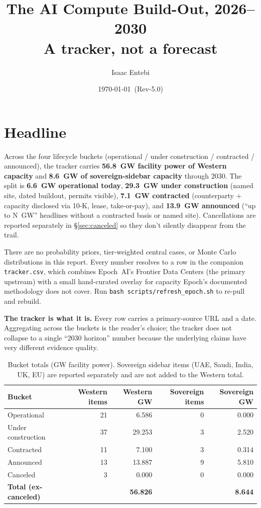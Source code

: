 \documentclass[11pt]{article}
\title{\textbf{The AI Compute Build-Out, 2026--2030} \\ \large A tracker, not a forecast}
\author{Isaac Entebi}
\date{\today\ (Rev-5.0)}
\begin{document}
\maketitle

\section*{Headline}

Across the four lifecycle buckets (operational / under construction / contracted / announced), the tracker carries 
\textbf{56.8~GW facility power of Western capacity} and \textbf{8.6~GW of sovereign-sidebar capacity} through 2030. The split is 
\textbf{6.6~GW operational today}, \textbf{29.3~GW under construction} (named site, dated buildout, permits visible), \textbf{7.1~GW contracted} (counterparty + capacity disclosed via 10-K, lease, take-or-pay), and \textbf{13.9~GW announced} (``up to N~GW'' headlines without a contracted basis or named site). Cancellations are reported separately in \S\ref{sec:canceled} so they don't silently disappear from the trail.

There are no probability priors, tier-weighted central cases, or Monte Carlo distributions in this report. Every number resolves to a row in the companion \texttt{tracker.csv}, which combines Epoch~AI's Frontier Data Centers (the primary upstream) with a small hand-curated overlay for capacity Epoch's documented methodology does not cover. Run \texttt{bash scripts/refresh\_epoch.sh} to re-pull and rebuild.

\textbf{The tracker is what it is.} Every row carries a primary-source URL and a date. Aggregating across the buckets is the reader's choice; the tracker does not collapse to a single ``2030 horizon'' number because the underlying claims have very different evidence quality.

\begin{table}[h]
\centering
\begin{tabular}{@{}lrrrr@{}}
\toprule
\textbf{Bucket} & \textbf{Western items} & \textbf{Western GW} & \textbf{Sovereign items} & \textbf{Sovereign GW} \\
\midrule
Operational & 21 & 6.586 & 0 & 0.000 \\
Under construction & 37 & 29.253 & 3 & 2.520 \\
Contracted & 11 & 7.100 & 3 & 0.314 \\
Announced & 13 & 13.887 & 9 & 5.810 \\
Canceled & 3 & 0.000 & 0 & 0.000 \\
\midrule \textbf{Total (ex-canceled)} & & \textbf{56.826} & & \textbf{8.644} \\
\bottomrule
\end{tabular}
\caption{Bucket totals (GW facility power). Sovereign sidebar items (UAE, Saudi, India, UK, EU) are reported separately and are not added to the Western total.}
\end{table}
\end{document}
